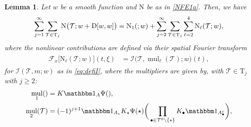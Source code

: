 \documentclass[%
11pt,  reqno]{amsart}
\makeatletter
\newcommand{\5}{\textup{V}}
\newcommand{\ind}{\mathbbm 1}
\newtheorem{lemma}[theorem]{Lemma}
\theoremstyle{remark}
\newcommand{\bul}{\bullet}
\newcommand{\TT}{\mathcal{T}}
\newcommand{\Tr}{\mathrm{T}}
\newcommand{\bfrak}{\mathfrak{b}}
\newcommand{\gfrak}{\mathfrak{g}}
\newcommand{\Ft}{{\mathcal{F}}}
\renewcommand{\l}{\ell}
\DeclareMathOperator{\mul}{mul}
\def\<#1>{\csname MH@symb@#1\endcsname}
\newcommand{\Ical}{\mathcal{I}}
\numberwithin{equation}{section}
\numberwithin{theorem}{section}
\newcommand{\NN}{\mathrm{N}}
\newcommand{\D}{\mathrm{D}}
\makeatother
\begin{document}
\begin{lemma}
\label{LEM:wint}
Let $w$ be a smooth function and $\NN$ be as in \eqref{NFE1a}.
Then, we have
\begin{align}
\label{wint0a}
\sum_{j=1}^\infty \sum_{\TT\in \Tr_j} \NN\big(\TT; w+
\D[w, w]
\big)
=
\NN_1(\<1>;w) + \sum_{j=2}^\infty \sum_{\TT\in\Tr_j} \sum_{\ell=2}^4  \NN_\ell(\TT; w),
\end{align}
where the nonlinear contributions are defined via their spatial Fourier transform
\begin{align}
\label{wint0b}
\begin{split}
\Ft_x \big[ \NN_\ell (\TT; w) \big] (t, \xi)& =
\Ical \big(\TT, {\mul}_\l(\TT); w \big) (t),
\end{split}
\end{align}
for $\Ical(\TT, m; w)$ as in \eqref{eq:defiI}, 
%
where the multipliers are given by, 
with $\TT\in \Tr_j$ with $j \ge 2$: %
\begin{align}
    \mul_1(\<1>)&= K\ind_A\Psi(\<1>),\\
    \mul_2(\TT)&=(-1)^{j+1} \ind_{A_\star} K_\star\Psi(\star) \bigg( \prod_{\bul \in \TT^0 \setminus\{\star\}}  K_\bul  \ind_{A_\bul^c} \bigg), 

\end{align}
\end{lemma}
\end{document}
